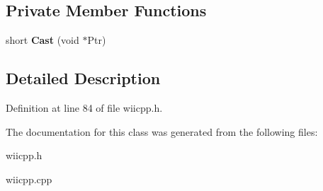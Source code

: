 \subsection*{\-Private \-Member \-Functions}
\begin{DoxyCompactItemize}
\item 
\hypertarget{class_c_nunchuk_buttons_a1fa701dac6b81d6bf8da7ed3b88ac0a1}{short {\bfseries \-Cast} (void $\ast$\-Ptr)}\label{class_c_nunchuk_buttons_a1fa701dac6b81d6bf8da7ed3b88ac0a1}

\end{DoxyCompactItemize}


\subsection{\-Detailed \-Description}


\-Definition at line 84 of file wiicpp.\-h.



\-The documentation for this class was generated from the following files\-:\begin{DoxyCompactItemize}
\item 
wiicpp.\-h\item 
wiicpp.\-cpp\end{DoxyCompactItemize}
